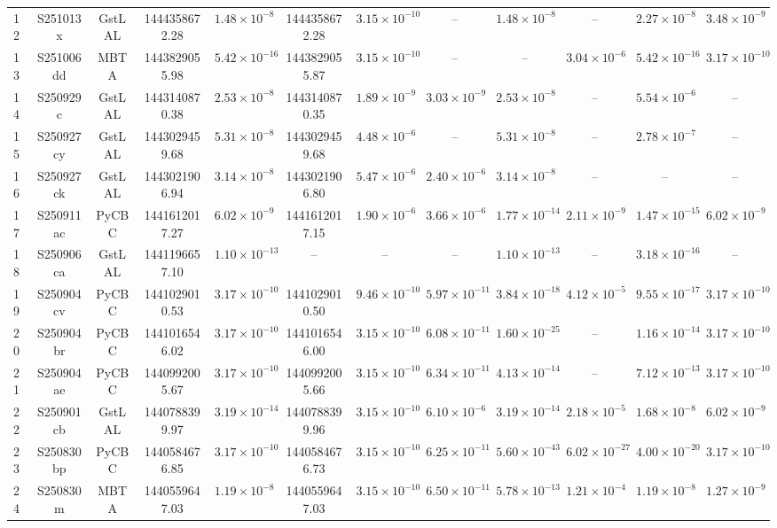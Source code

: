 \begin{refsection}
\begin{table}[ht]
{\begin{tabular}{!{\vrule width 1pt}lccccccccccc!{\vrule width 1pt}}
12 & S251013x & GstLAL & 1444358672.28 & $1.48 \times 10^{-8}$ & 1444358672.28 & $3.15 \times 10^{-10}$ & -- & $1.48 \times 10^{-8}$ & -- & $2.27 \times 10^{-8}$ & $3.48 \times 10^{-9}$ \\
13 & S251006dd & MBTA & 1443829055.98 & $5.42 \times 10^{-16}$ & 1443829055.87 & $3.15 \times 10^{-10}$ & -- & -- & $3.04 \times 10^{-6}$ & $5.42 \times 10^{-16}$ & $3.17 \times 10^{-10}$ \\
14 & S250929c & GstLAL & 1443140870.38 & $2.53 \times 10^{-8}$ & 1443140870.35 & $1.89 \times 10^{-9}$ & $3.03 \times 10^{-9}$ & $2.53 \times 10^{-8}$ & -- & $5.54 \times 10^{-6}$ & -- \\
15 & S250927cy & GstLAL & 1443029459.68 & $5.31 \times 10^{-8}$ & 1443029459.68 & $4.48 \times 10^{-6}$ & -- & $5.31 \times 10^{-8}$ & -- & $2.78 \times 10^{-7}$ & -- \\
16 & S250927ck & GstLAL & 1443021906.94 & $3.14 \times 10^{-8}$ & 1443021906.80 & $5.47 \times 10^{-6}$ & $2.40 \times 10^{-6}$ & $3.14 \times 10^{-8}$ & -- & -- & -- \\
17 & S250911ac & PyCBC & 1441612017.27 & $6.02 \times 10^{-9}$ & 1441612017.15 & $1.90 \times 10^{-6}$ & $3.66 \times 10^{-6}$ & $1.77 \times 10^{-14}$ & $2.11 \times 10^{-9}$ & $1.47 \times 10^{-15}$ & $6.02 \times 10^{-9}$ \\
18 & S250906ca & GstLAL & 1441196657.10 & $1.10 \times 10^{-13}$ & -- & -- & -- & $1.10 \times 10^{-13}$ & -- & $3.18 \times 10^{-16}$ & -- \\
19 & S250904cv & PyCBC & 1441029010.53 & $3.17 \times 10^{-10}$ & 1441029010.50 & $9.46 \times 10^{-10}$ & $5.97 \times 10^{-11}$ & $3.84 \times 10^{-18}$ & $4.12 \times 10^{-5}$ & $9.55 \times 10^{-17}$ & $3.17 \times 10^{-10}$ \\
20 & S250904br & PyCBC & 1441016546.02 & $3.17 \times 10^{-10}$ & 1441016546.00 & $3.15 \times 10^{-10}$ & $6.08 \times 10^{-11}$ & $1.60 \times 10^{-25}$ & -- & $1.16 \times 10^{-14}$ & $3.17 \times 10^{-10}$ \\
21 & S250904ae & PyCBC & 1440992005.67 & $3.17 \times 10^{-10}$ & 1440992005.66 & $3.15 \times 10^{-10}$ & $6.34 \times 10^{-11}$ & $4.13 \times 10^{-14}$ & -- & $7.12 \times 10^{-13}$ & $3.17 \times 10^{-10}$ \\
22 & S250901cb & GstLAL & 1440788399.97 & $3.19 \times 10^{-14}$ & 1440788399.96 & $3.15 \times 10^{-10}$ & $6.10 \times 10^{-6}$ & $3.19 \times 10^{-14}$ & $2.18 \times 10^{-5}$ & $1.68 \times 10^{-8}$ & $6.02 \times 10^{-9}$ \\
23 & S250830bp & PyCBC & 1440584676.85 & $3.17 \times 10^{-10}$ & 1440584676.73 & $3.15 \times 10^{-10}$ & $6.25 \times 10^{-11}$ & $5.60 \times 10^{-43}$ & $6.02 \times 10^{-27}$ & $4.00 \times 10^{-20}$ & $3.17 \times 10^{-10}$ \\
24 & S250830m & MBTA & 1440559647.03 & $1.19 \times 10^{-8}$ & 1440559647.03 & $3.15 \times 10^{-10}$ & $6.50 \times 10^{-11}$ & $5.78 \times 10^{-13}$ & $1.21 \times 10^{-4}$ & $1.19 \times 10^{-8}$ & $1.27 \times 10^{-9}$ \\
\bottomrule[1pt]
\end{tabular}

}
\end{table}
\end{refsection}
